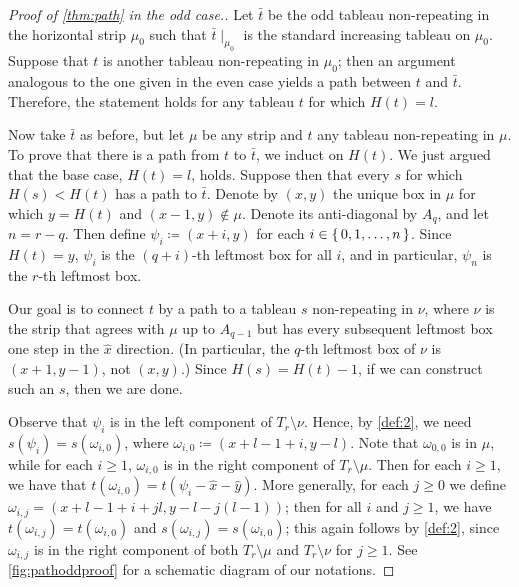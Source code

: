 \documentclass[11pt,reqno]{amsart}
\newcommand*{\restrict}[1]{{\mid}_{#1}}
\theoremstyle{definition}
\theoremstyle{problem}
\theoremstyle{plain}
\theoremstyle{remark}
\theoremstyle{theorem}
\numberwithin{equation}{section}
\numberwithin{figure}{section}
\theoremstyle{definition}
\theoremstyle{problem}
\theoremstyle{plain}
\begin{document}
\begin{proof}[Proof of \cref{thm:path} in the odd case.]
  Let $\bar{t}$ be the odd tableau non-repeating in the horizontal
  strip $\mu_0$ such that $\bar{t}\restrict{\mu_0}$ is the standard
  increasing tableau on $\mu_0$.  Suppose that $t$ is another tableau
  non-repeating in $\mu_0$; then an argument analogous to the one
  given in the even case yields a path between   $t$ and
  $\bar{t}$.  Therefore, the statement holds for any tableau $t$ for which $H(t) = l$.

  Now take $\bar{t}$ as before, but let $\mu$ be any strip and $t$ any
  tableau non-repeating in $\mu$.  To prove that there is a path from
  $t$ to $\bar{t}$, we induct on $H(t)$.  We just argued that the base
  case, $H(t) = l$, holds.  Suppose then that every $s$ for which
  $H(s) < H(t)$ has a path to $\bar{t}$.  Denote by $(x,y)$ the
  unique box in $\mu$ for which $y = H(t)$ and $(x-1,y) \nin \mu$.
  Denote its anti-diagonal by $A_q$, and let $n = r - q$.  Then define
  $\psi_i \coloneq (x+i,y)$ for each $i \in \set{0,1,\ldots,n}$.
  Since $H(t) = y$, $\psi_i$ is the $(q + i)$-th leftmost box for all
  $i$, and in particular, $\psi_n$ is the $r$-th leftmost box.

  Our goal is to connect $t$ by a path to a tableau $s$ non-repeating
  in $\nu$, where $\nu$ is the strip that agrees with $\mu$ up to
  $A_{q-1}$ but has every subsequent leftmost box one step in the
  $\hat x$ direction.  (In particular, the $q$-th leftmost box of
  $\nu$ is $(x+1,y-1)$, not $(x,y)$.)  Since $H(s) = H(t) - 1$, if we
  can construct such an $s$, then we are done.

  Observe that $\psi_i$ is in the left component of
  $T_r \setminus \nu$.  Hence, by \cref{def:2}, we need
  $s(\psi_i) = s(\omega_{i,0})$, where
  $\omega_{i,0} \coloneq (x+l-1+i,y-l)$.  Note that $\omega_{0,0}$ is
  in $\mu$, while for each $i \geq 1$, $\omega_{i,0}$ is in the right
  component of $T_r \setminus \mu$.  Then for each $i \geq 1$, we have
  that $t(\omega_{i,0}) = t(\psi_i - \hat x - \hat y)$.  More
  generally, for each $j \geq 0$ we define
  $\omega_{i,j} = (x+l-1+i+jl,y-l-j(l-1))$; then for all $i$ and
  $j \geq 1$, we have $t(\omega_{i,j}) = t(\omega_{i,0})$ and
  $s(\omega_{i,j}) = s(\omega_{i,0})$; this again follows by
  \cref{def:2}, since $\omega_{i,j}$ is in the right component of both
  $T_r \setminus \mu$ and $T_r \setminus \nu$ for $j \geq 1$.  See
  \cref{fig:pathoddproof} for a schematic diagram of our notations.


\end{proof}
\end{document}
